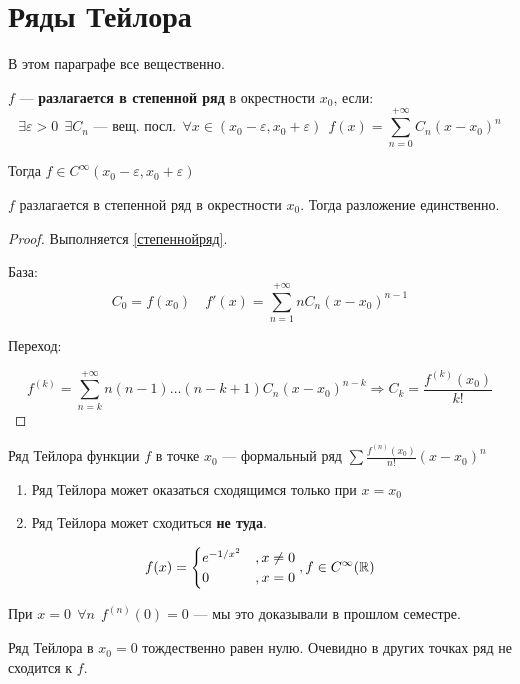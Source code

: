 \section*{Ряды Тейлора}

В этом параграфе все вещественно.

\begin{definition}
    \(f\) --- \textbf{разлагается в степенной ряд} в окрестности \(x_0\), если:
    \begin{equation}
        \exists \varepsilon > 0\ \ \exists C_n \text{ --- вещ. посл.}\ \ \forall x\in(x_0 - \varepsilon, x_0 + \varepsilon)\ \ f(x) = \sum_{n=0}^{+\infty} C_n(x - x_0)^n \label{степеннойряд}
    \end{equation}
\end{definition}
\begin{remark}
    Тогда \(f\in C^{\infty}(x_0 - \varepsilon, x_0 + \varepsilon)\)
\end{remark}

\begin{theorem}[о единственности]
    \(f\) разлагается в степенной ряд в окрестности \(x_0\). Тогда разложение единственно.
\end{theorem}
\begin{proof}
    Выполняется \ref{степеннойряд}.

    База:
    \[C_0 = f(x_0) \quad f'(x) = \sum_{n = 1}^{ +\infty} n C_n(x - x_0)^{n - 1}\]

    Переход:

    \[f^{(k)} = \sum_{n = k}^{ +\infty} n(n - 1)\dots (n - k + 1)C_n (x - x_0)^{n - k} \Rightarrow C_k = \frac{f^{(k)}(x_0)}{k!}\]
\end{proof}
\begin{definition}
    Ряд Тейлора функции \(f\) в точке \(x_0\) --- формальный ряд \(\sum \frac{f^{(n)}(x_0)}{n!} (x - x_0)^n\)
\end{definition}

\begin{remark}\itemfix
    \begin{enumerate}
        \item Ряд Тейлора может оказаться сходящимся только при \(x = x_0\)
        \item Ряд Тейлора может сходиться \textbf{не туда}.
    \end{enumerate}
\end{remark}

\begin{example}[2]
    \[f(x) = \begin{cases}
            e^{-1/x^2} & , x\neq 0 \\
            0          & , x = 0   \\
        \end{cases}, f\in C^{\infty}(\mathbb{R})\]

    При \(x = 0\ \ \forall n \ \ f^{(n)}(0) = 0\) --- мы это доказывали в прошлом семестре.

    Ряд Тейлора в \(x_0 = 0\) тождественно равен нулю. Очевидно в других точках ряд не сходится к \(f\).
\end{example}

